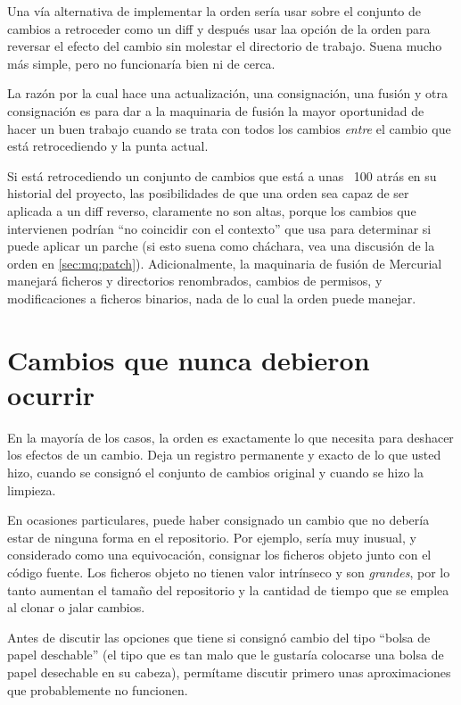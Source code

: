Una vía alternativa de implementar la orden  sería usar
 sobre el conjunto de cambios a retroceder como un diff
y después usar laa opción  de la orden
 para reversar el efecto del cambio sin molestar el
directorio de trabajo.  Suena mucho más simple, pero no funcionaría
bien ni de cerca.

La razón por la cual  hace una actualización, una
consignación, una fusión y otra consignación es para dar a la
maquinaria de fusión la mayor oportunidad de hacer un buen trabajo
cuando se trata con todos los cambios \emph{entre} el cambio que está
retrocediendo y la punta actual.

Si está retrocediendo un conjunto de cambios que está a unas ~100
atrás en su historial del proyecto, las posibilidades de que una orden
 sea capaz de ser aplicada a un diff reverso,
claramente no son altas, porque los cambios que intervienen podrían
``no coincidir con el contexto'' que  usa  para
determinar si puede aplicar un parche (si esto suena como cháchara,
vea una discusión de la orden  en \ref{sec:mq:patch}).
Adicionalmente, la maquinaria de fusión de Mercurial manejará ficheros
y directorios renombrados, cambios de permisos, y modificaciones a
ficheros binarios, nada de lo cual la orden  puede manejar.

\section{Cambios que nunca debieron ocurrir}
\label{sec:undo:aaaiiieee}

En la mayoría de los casos, la orden  es exactamente lo
que necesita para deshacer los efectos de un cambio.  Deja un registro
permanente y exacto de lo que usted hizo, cuando se consignó el
conjunto de cambios original y cuando se hizo la limpieza.

En ocasiones particulares, puede haber consignado un cambio que no
debería estar de ninguna forma en el repositorio.  Por ejemplo, sería
muy inusual, y considerado como una equivocación, consignar los
ficheros objeto junto con el código fuente. Los ficheros objeto no
tienen valor intrínseco y son \emph{grandes}, por lo tanto aumentan el
tamaño del repositorio y la cantidad de tiempo que se emplea al clonar
o jalar cambios.

Antes de discutir las opciones que tiene si consignó cambio del tipo 
``bolsa de papel deschable'' (el tipo que es tan malo que le gustaría
colocarse una bolsa de papel desechable en su cabeza), permítame
discutir primero unas aproximaciones que probablemente no funcionen.

